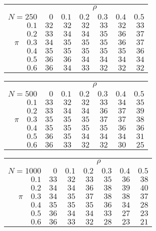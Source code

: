 \begin{tabular}{r|rrrrrr}
\hline\hline
 &\multicolumn{6}{c}{$\rho$} \\ 
 $N = 250$ & $0$ & $0.1$ & $0.2$ & $0.3$ & $0.4$ & $0.5$ \\ 
 \hline$0.1$ & $32$ & $32$ & $32$ & $33$ & $32$ & $33$\\ 
$0.2$ & $33$ & $34$ & $34$ & $35$ & $36$ & $37$\\ 
$\pi\quad$$0.3$ & $34$ & $35$ & $35$ & $35$ & $36$ & $37$\\ 
$0.4$ & $35$ & $35$ & $35$ & $35$ & $35$ & $36$\\ 
$0.5$ & $36$ & $36$ & $34$ & $34$ & $34$ & $34$\\ 
$0.6$ & $36$ & $34$ & $33$ & $32$ & $32$ & $32$\\ 
 \hline 
 \end{tabular}
 
 \vspace{2em} 
 
\begin{tabular}{r|rrrrrr}
\hline\hline
 &\multicolumn{6}{c}{$\rho$} \\ 
 $N = 500$ & $0$ & $0.1$ & $0.2$ & $0.3$ & $0.4$ & $0.5$ \\ 
 \hline$0.1$ & $33$ & $32$ & $32$ & $33$ & $34$ & $35$\\ 
$0.2$ & $33$ & $34$ & $34$ & $36$ & $37$ & $39$\\ 
$\pi\quad$$0.3$ & $35$ & $35$ & $35$ & $37$ & $37$ & $38$\\ 
$0.4$ & $35$ & $35$ & $35$ & $35$ & $36$ & $36$\\ 
$0.5$ & $36$ & $35$ & $34$ & $34$ & $34$ & $31$\\ 
$0.6$ & $36$ & $33$ & $32$ & $32$ & $30$ & $25$\\ 
 \hline 
 \end{tabular}
 
 \vspace{2em} 
 
\begin{tabular}{r|rrrrrr}
\hline\hline
 &\multicolumn{6}{c}{$\rho$} \\ 
 $N = 1000$ & $0$ & $0.1$ & $0.2$ & $0.3$ & $0.4$ & $0.5$ \\ 
 \hline$0.1$ & $33$ & $32$ & $33$ & $35$ & $36$ & $38$\\ 
$0.2$ & $34$ & $34$ & $36$ & $38$ & $39$ & $40$\\ 
$\pi\quad$$0.3$ & $34$ & $35$ & $37$ & $38$ & $38$ & $37$\\ 
$0.4$ & $35$ & $35$ & $35$ & $36$ & $34$ & $28$\\ 
$0.5$ & $36$ & $34$ & $34$ & $33$ & $27$ & $23$\\ 
$0.6$ & $36$ & $33$ & $32$ & $28$ & $23$ & $21$\\ 
 \hline 
 \end{tabular}